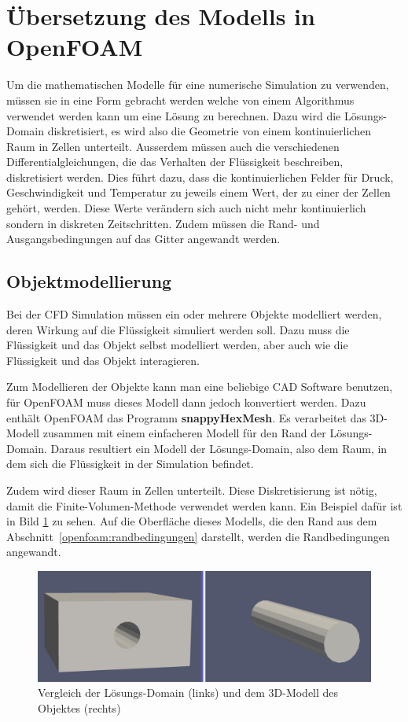 \section{Übersetzung des Modells in OpenFOAM}
Um die mathematischen Modelle für eine numerische Simulation zu verwenden, müssen sie in eine Form gebracht werden welche von einem Algorithmus verwendet werden kann um eine Lösung zu berechnen.
Dazu wird die Lösungs-Domain diskretisiert, es wird also die Geometrie von einem kontinuierlichen Raum in Zellen unterteilt.
%
Ausserdem müssen auch die verschiedenen Differentialgleichungen, die das Verhalten der Flüssigkeit beschreiben, diskretisiert werden.
%
Dies führt dazu, dass die kontinuierlichen Felder für Druck, Geschwindigkeit und Temperatur zu jeweils einem Wert, der zu einer der Zellen gehört, werden.
Diese Werte verändern sich auch nicht mehr kontinuierlich sondern in diskreten Zeitschritten.
Zudem müssen die Rand- und Ausgangsbedingungen auf das Gitter angewandt werden.


\subsection{Objektmodellierung}
Bei der CFD Simulation müssen ein oder mehrere Objekte modelliert werden, deren Wirkung auf die Flüssigkeit simuliert werden soll. 
Dazu muss die Flüssigkeit und das Objekt selbst modelliert werden, aber auch wie die Flüssigkeit und das Objekt interagieren.

Zum Modellieren der Objekte kann man eine beliebige CAD Software benutzen, für OpenFOAM muss dieses Modell dann jedoch konvertiert werden.
Dazu enthält OpenFOAM das Programm \textbf{snappyHexMesh}.
%
Es verarbeitet das 3D-Modell zusammen mit einem einfacheren Modell für den Rand der Lösungs-Domain. 
Daraus resultiert ein Modell der Lösungs-Domain, also dem Raum, in dem sich die Flüssigkeit in der Simulation befindet.

Zudem wird dieser Raum in Zellen unterteilt.
Diese Diskretisierung ist nötig, damit die Finite-Volumen-Methode verwendet werden kann.
Ein Beispiel dafür ist in Bild \ref{openfoam:fig:SD_Modell_vergleich} zu sehen.
Auf die Oberfläche dieses Modells, die den Rand aus dem Abschnitt~\ref{openfoam:randbedingungen} darstellt, werden die Randbedingungen angewandt.
\begin{figure}
	\centering
	\includegraphics[width=\textwidth]{papers/openfoam/Bilder/vergleich_solution_domain_object.png}
	\caption{Vergleich der Lösungs-Domain (links) und dem 3D-Modell des Objektes (rechts)}
	\label{openfoam:fig:SD_Modell_vergleich}
\end{figure}

